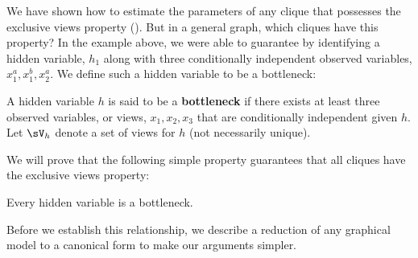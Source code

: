 We have shown how to estimate the parameters of any clique that possesses the exclusive
  views property (). But in a general graph, which cliques have this property?
In the example above, we were able to guarantee 
  by identifying a hidden variable, $h_1$ along with three conditionally
  independent observed variables, $x^a_1, x^b_1, x^a_2$.
We define such a hidden variable to be a bottleneck:
\begin{definition}[Bottleneck]
  A hidden variable $h$ is said to be a \textbf{bottleneck} if there
  exists at least three observed variables, or views, $x_1, x_2, x_3$
  that are conditionally independent given $h$. 
  Let $\sV_{h}$ denote a set of views for $h$ (not necessarily unique).
\end{definition}

We will prove that the following simple property guarantees that all cliques
have the exclusive views property:
\begin{property}
  \label{prop:bottleneck}
  Every hidden variable is a bottleneck.
\end{property}


Before we establish this relationship,
we describe a reduction of any graphical model to
  a canonical form to make our arguments simpler.

